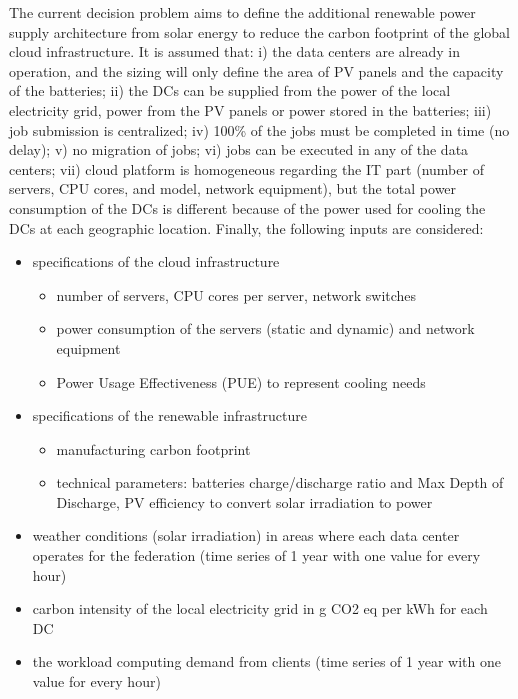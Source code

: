 The current decision problem aims to define the additional renewable power supply architecture from solar energy to reduce the carbon footprint of the global cloud infrastructure. It is assumed that: i) the data centers are already in operation, and the sizing will only define the area of PV panels and the capacity of the batteries; ii) the DCs can be supplied from the power of the local electricity grid, power from the PV panels or power stored in the batteries; iii) job submission is centralized; iv) 
100\% of the jobs must be completed in time (no delay); v) no migration of jobs; vi) jobs can be executed in any of the data centers; vii) cloud platform is homogeneous regarding the IT part (number of servers, CPU cores, and model, network equipment), but the total power consumption of the DCs is different because of the power used for cooling the DCs at each geographic location. Finally, the following inputs are considered:

\begin{itemize}
    \item specifications of the cloud infrastructure 
    \begin{itemize}
        \item number of servers, CPU cores per server, network switches
        \item power consumption of the servers (static and dynamic) and network equipment
        \item Power Usage Effectiveness (PUE) to represent cooling needs
    \end{itemize}
    
    \item specifications of the renewable infrastructure
    \begin{itemize}
        \item manufacturing carbon footprint
        \item technical parameters: batteries charge/discharge ratio and Max Depth of Discharge, PV efficiency to convert solar irradiation to power
    \end{itemize}
    \item weather conditions (solar irradiation) in areas where each data center operates for the federation (time series of 1 year with one value for every hour)
    \item carbon intensity of the local electricity grid in g CO2 eq per kWh for each DC
    \item the workload computing demand from clients (time series of 1 year with one value for every hour)

\end{itemize}


